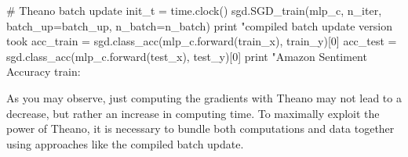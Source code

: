 \begin{exercise}
\begin{python}
# Theano batch update
init_t = time.clock()
sgd.SGD_train(mlp_c, n_iter, batch_up=batch_up, n_batch=n_batch)
print "\nTheano compiled batch update version took %
acc_train = sgd.class_acc(mlp_c.forward(train_x), train_y)[0]
acc_test  = sgd.class_acc(mlp_c.forward(test_x), test_y)[0]
print "Amazon Sentiment Accuracy train: %
\end{python}
As you may observe, just computing the gradients with Theano may not lead to
a decrease, but rather an increase in computing time. To maximally exploit
the power of Theano, it is necessary to bundle both computations and data 
together using approaches like the compiled batch update.
\end{exercise}
